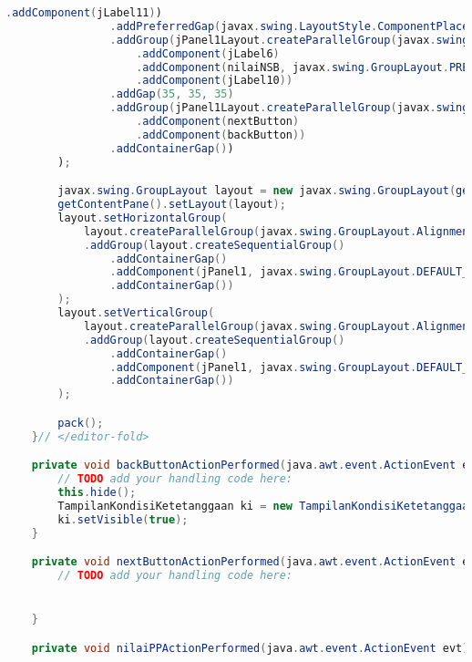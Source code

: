 \begin{lstlisting}[language=Java, caption=TampilanKondisiEksternal.java]
                    .addComponent(jLabel11))
                .addPreferredGap(javax.swing.LayoutStyle.ComponentPlacement.UNRELATED)
                .addGroup(jPanel1Layout.createParallelGroup(javax.swing.GroupLayout.Alignment.BASELINE)
                    .addComponent(jLabel6)
                    .addComponent(nilaiNSB, javax.swing.GroupLayout.PREFERRED_SIZE, javax.swing.GroupLayout.DEFAULT_SIZE, javax.swing.GroupLayout.PREFERRED_SIZE)
                    .addComponent(jLabel10))
                .addGap(35, 35, 35)
                .addGroup(jPanel1Layout.createParallelGroup(javax.swing.GroupLayout.Alignment.BASELINE)
                    .addComponent(nextButton)
                    .addComponent(backButton))
                .addContainerGap())
        );

        javax.swing.GroupLayout layout = new javax.swing.GroupLayout(getContentPane());
        getContentPane().setLayout(layout);
        layout.setHorizontalGroup(
            layout.createParallelGroup(javax.swing.GroupLayout.Alignment.LEADING)
            .addGroup(layout.createSequentialGroup()
                .addContainerGap()
                .addComponent(jPanel1, javax.swing.GroupLayout.DEFAULT_SIZE, javax.swing.GroupLayout.DEFAULT_SIZE, Short.MAX_VALUE)
                .addContainerGap())
        );
        layout.setVerticalGroup(
            layout.createParallelGroup(javax.swing.GroupLayout.Alignment.LEADING)
            .addGroup(layout.createSequentialGroup()
                .addContainerGap()
                .addComponent(jPanel1, javax.swing.GroupLayout.DEFAULT_SIZE, javax.swing.GroupLayout.DEFAULT_SIZE, Short.MAX_VALUE)
                .addContainerGap())
        );

        pack();
    }// </editor-fold>                        

    private void backButtonActionPerformed(java.awt.event.ActionEvent evt) {                                           
        // TODO add your handling code here:
        this.hide();
        TampilanKondisiKetetanggaan ki = new TampilanKondisiKetetanggaan();
        ki.setVisible(true);
    }                                          

    private void nextButtonActionPerformed(java.awt.event.ActionEvent evt) {                                           
        // TODO add your handling code here:


    }                                          

    private void nilaiPPActionPerformed(java.awt.event.ActionEvent evt) {                                        


\end{lstlisting}
